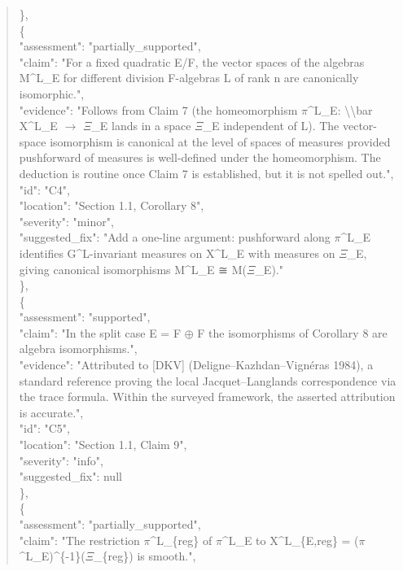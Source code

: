 \documentclass[11pt]{article}
\begin{document}
\begin{quote}
    \},\\
    \{\\
      "assessment": "partially\_supported",\\
      "claim": "For a fixed quadratic E/F, the vector spaces of the algebras M\^{}L\_E for different division F-algebras L of rank n are canonically isomorphic.",\\
      "evidence": "Follows from Claim 7 (the homeomorphism \ensuremath{\pi}\^{}L\_E: \textbackslash{}\textbackslash{}bar X\^{}L\_E \ensuremath{\to} \ensuremath{\Xi}\_E lands in a space \ensuremath{\Xi}\_E independent of L). The vector-space isomorphism is canonical at the level of spaces of measures provided pushforward of measures is well-defined under the homeomorphism. The deduction is routine once Claim 7 is established, but it is not spelled out.",\\
      "id": "C4",\\
      "location": "Section 1.1, Corollary 8",\\
      "severity": "minor",\\
      "suggested\_fix": "Add a one-line argument: pushforward along \ensuremath{\pi}\^{}L\_E identifies G\^{}L-invariant measures on X\^{}L\_E with measures on \ensuremath{\Xi}\_E, giving canonical isomorphisms M\^{}L\_E ≅ M(\ensuremath{\Xi}\_E)."\\
    \},\\
    \{\\
      "assessment": "supported",\\
      "claim": "In the split case E = F \ensuremath{\oplus} F the isomorphisms of Corollary 8 are algebra isomorphisms.",\\
      "evidence": "Attributed to [DKV] (Deligne--Kazhdan--Vignéras 1984), a standard reference proving the local Jacquet--Langlands correspondence via the trace formula. Within the surveyed framework, the asserted attribution is accurate.",\\
      "id": "C5",\\
      "location": "Section 1.1, Claim 9",\\
      "severity": "info",\\
      "suggested\_fix": null\\
    \},\\
    \{\\
      "assessment": "partially\_supported",\\
      "claim": "The restriction \ensuremath{\pi}\^{}L\_\{reg\} of \ensuremath{\pi}\^{}L\_E to X\^{}L\_\{E,reg\} = (\ensuremath{\pi}\^{}L\_E)\^{}\{-1\}(\ensuremath{\Xi}\_\{reg\}) is smooth.",\\

\end{quote}
\end{document}
